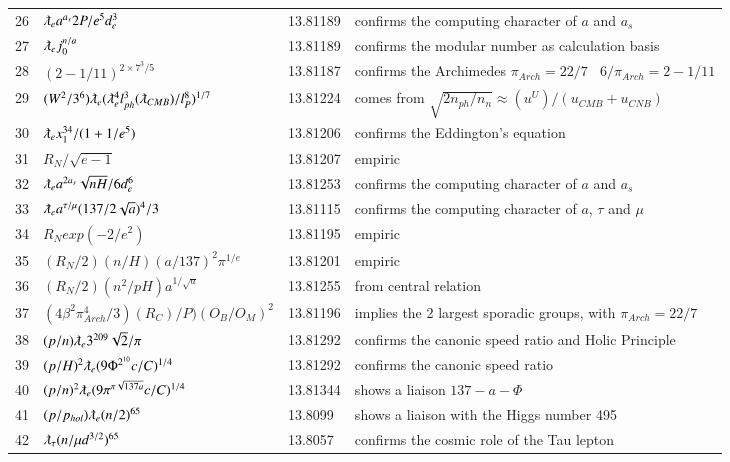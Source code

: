 \documentclass[a4paper,9pt]{article}
\begin{document}
\begin{appendix}
\begin{table}
\begin{tabular}{llll}
   26 & $\lambdabar_{e} a^{a_s} 2P/e^5d_e^3$ & 13.81189 & confirms the computing character of $a$ and $a_s$ \\
   27 & $\lambdabar_{e} j_0^{n/a}$ & 13.81189 & confirms the modular number as calculation basis\\
   28 & $(2-1/11)^{2\times 7^3/5}$ & 13.81187 & confirms the Archimedes $\pi_{Arch} = 22/7~~~~ 6/\pi_{Arch} =2-1/11$\\
   29 & $ (W^2/3^6)\lambdabar_{e} (\lambdabar_{e}^4 l_{ph}^3 (\lambdabar_{CMB})/l_P^8)^{1/7}$ & 13.81224 & comes from $\sqrt{2n_{ph}/n_n} \approx (u^U)/(u_{CMB}+u_{CNB})$\\ 
   30 & $\lambdabar_{e} x_1^{34} /(1+1/e^5)$ & 13.81206 & confirms the Eddington's equation\\
   31 & $R_N /\sqrt {e-1}$ & 13.81207 & empiric\\
   32 & $\lambdabar_{e} a^{2a_s} \sqrt{nH}/6d_e^6 $ & 13.81253 & confirms the computing character of $a$ and $a_s$\\
   33 & $\lambdabar_{e} a^{\tau / \mu} (137/2\sqrt a)^4 /3 $ & 13.81115 & confirms the computing character of $a$, $\tau$ and $\mu$\\
   34 & $R_N exp(-2/e^2)$ & 13.81195 & empiric\\
   35 & $(R_N/2)(n/H)(a/137)^2 \pi^{1/e}$ & 13.81201 & empiric\\ 
   36 & $(R_N/2)(n^2/pH)a^{1/\sqrt a}$ & 13.81255 & from central relation\\
   37 & $(4\beta^2 \pi_{Arch}^4 /3) (R_C)/P) (O_B/O_M)^2$ & 13.81196 & implies the 2 largest sporadic groups, with $\pi_{Arch} =
  22/7$\\  
   38 & $(p/n) \lambdabar_{e} 3^{209} \sqrt2/\pi$ & 13.81292 & confirms the canonic speed ratio and Holic Principle\\   
   39 & $(p/H)^2 \lambdabar_{e} (9\Phi^{2^{10}}c/C)^{1/4}$ & 13.81292 & confirms the canonic speed ratio\\   
   40 & $(p/n)^2 \lambdabar_{e} (9\pi^{\pi \sqrt{137a}}c/C)^{1/4}$ & 13.81344 & shows a liaison $137-a-\Phi$\\  
   41 & $(p/p_{hol}) \lambdabar_{e} (n/2)^{65}$ & 13.8099 & shows a liaison with the Higgs number 495\\  
   42 & $ \lambdabar_{\tau} (n/\mu d^{3/2})^{65} $ & 13.8057 & confirms the cosmic role of the Tau lepton \\

\end{tabular}
\end{table}
\end{appendix}
\end{document}
